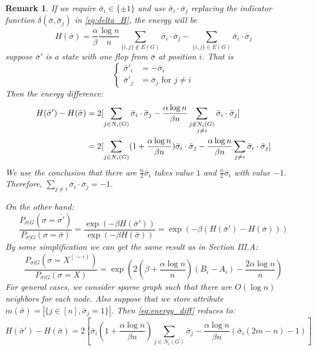 \documentclass{ctexart}
\newtheorem{remark}{Remark}
\begin{document}
	\begin{remark}
	If we require $\bar{\sigma}_i \in \{\pm 1\}$ and use $\bar{\sigma}_i \cdot \bar{\sigma}_j$ replacing
	the indicator function  $\delta(\bar{\sigma},\bar{\sigma}_j)$ in \eqref{eq:delta_H}, the energy will be
	$$
	H(\bar{\sigma}) = \frac{\alpha}{\beta} \frac{\log n}{n} \sum_{\{i,j\}\not\in E(G)}\bar{\sigma}_i \cdot \bar{\sigma}_j
		- \sum_{\{i,j\}\in E(G)}\bar{\sigma}_i \cdot \bar{\sigma}_j
	 $$
	 suppose $\bar{\sigma}'$ is a state with one flop from $\bar{\sigma}$ at position $i$. That is
	 $$
	 \begin{cases}
	 \bar{\sigma}'_i &= -\bar{\sigma}_i \\
	 \bar{\sigma}'_j & = \bar{\sigma}_j \textrm{ for } j \neq i
	 \end{cases}
	 $$
	 Then the energy difference:
	 \begin{align}
	 H(\bar{\sigma}') - H(\bar{\sigma}) &= 2[\sum_{j\in N_i(G)}\bar{\sigma}_i \cdot \bar{\sigma}_j - \frac{\alpha \log n}{\beta n}
	 \sum_{\substack{j\not\in N_i(G) \\ j\neq i}} \bar{\sigma}_i \cdot \bar{\sigma}_j ] \notag\\
	 & = 2 [\sum_{j\in N_i(G)}(1+\frac{\alpha \log n}{\beta n})\bar{\sigma}_i \cdot \bar{\sigma}_j - \frac{\alpha \log n}{\beta n}
	 \sum_{j\neq i} \bar{\sigma}_i \cdot \bar{\sigma}_j ] \label{eq:energy_diff}
	 \end{align}
	 We use the conclusion that there are $\frac{n}{2} \bar{\sigma}_i$ takes value $1$ and $\frac{n}{2}\bar{\sigma}_i$ with value
	 $-1$. Therefore, $\sum_{j\neq i} \bar{\sigma}_i \cdot\bar{\sigma}_j = -1$.
	 
	 On the other hand:
	 $$
	 \frac{P_{\sigma | G}(\sigma = \bar{\sigma'})}{P_{\sigma | G}(\sigma = \bar{\sigma})}
	 = \frac{\exp(-\beta H(\bar{\sigma}'))}{\exp(-\beta H(\bar{\sigma}))} = \exp(-\beta(H(\bar{\sigma}')-H(\bar{\sigma})))
	 $$
	 By some simplification we can get the same result as \cite{ye2020exact} in Section III.A:
	 $$
	 \frac{P_{\sigma |G }(\sigma = X^{(\sim i)})}{P_{\sigma |G }(\sigma = X)}
	 = \exp(2(\beta + \frac{\alpha \log n}{n})(B_i - A_i)-\frac{2\alpha \log n}{n})
	 $$
	 For general cases, we consider sparse graph such that there are $O(\log n)$ neighbors for each node.
	 Also suppose that we store  attribute $m(\bar{\sigma})= |\{j \in [n], \bar{\sigma}_j = 1 \}|$.
	 Then \eqref{eq:energy_diff} reduces to:
	 \begin{equation}
	 H(\bar{\sigma}') - H(\bar{\sigma}) = 2 [\bar{\sigma}_i(1+\frac{\alpha \log n}{\beta n}) \sum_{j\in N_i(G)}\bar{\sigma}_j - \frac{\alpha \log n}{\beta n}
	 (\bar{\sigma}_i (2m-n)-1) ]
	 \end{equation}
	\end{remark}
\end{document}
